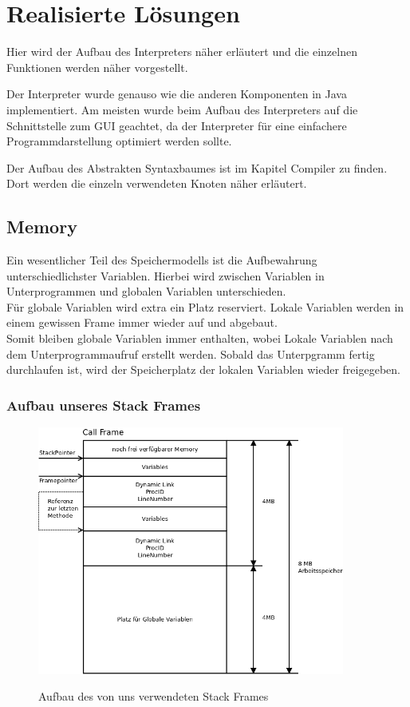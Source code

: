 \section{Realisierte Lösungen}
Hier wird der Aufbau des Interpreters näher erläutert und die einzelnen Funktionen werden näher vorgestellt.

Der Interpreter wurde genauso wie die anderen Komponenten in Java implementiert.
Am meisten wurde beim Aufbau des Interpreters auf die Schnittstelle zum GUI geachtet, da der Interpreter für eine einfachere
Programmdarstellung optimiert werden sollte.

Der Aufbau des Abstrakten Syntaxbaumes ist im Kapitel Compiler zu finden. Dort werden die einzeln verwendeten 
Knoten näher erläutert.

\subsection{Memory}
Ein wesentlicher Teil des Speichermodells ist die Aufbewahrung unterschiedlichster Variablen. Hierbei wird zwischen Variablen in Unterprogrammen und globalen Variablen unterschieden. \\
Für globale Variablen wird extra ein Platz reserviert. Lokale Variablen werden in einem gewissen Frame immer wieder auf und abgebaut. \\
Somit bleiben globale Variablen immer enthalten, wobei Lokale Variablen nach dem Unterprogrammaufruf erstellt werden. Sobald das Unterpgramm fertig durchlaufen ist, wird der Speicherplatz der lokalen Variablen wieder freigegeben.

\subsubsection{Aufbau unseres Stack Frames}
\begin{figure}[Stack Frame]
\begin{center}
\includegraphics[width=0.9\textwidth]{./media/images/interpreter/memory/stackframe.png}
\label{stackframe1} 
\caption{Aufbau des von uns verwendeten Stack Frames}
\end{center}
\end{figure}

